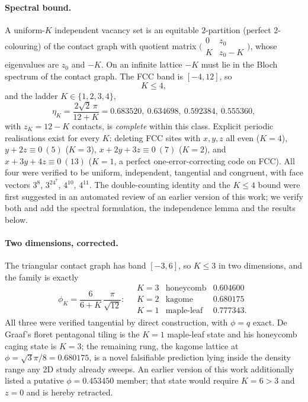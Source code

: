 \documentclass[aps,prl,twocolumn,superscriptaddress,floatfix]{revtex4-2}
\begin{document}
\paragraph{Spectral bound.} A uniform-$K$ independent vacancy set is an
equitable $2$-partition (perfect $2$-colouring) of the contact graph with
quotient matrix $\bigl(\begin{smallmatrix}0 & z_0\\ K & z_0-K\end{smallmatrix}\bigr)$,
whose eigenvalues are $z_0$ and $-K$. On an infinite lattice $-K$ must lie in
the Bloch spectrum of the contact graph. The FCC band is $[-4,12]$, so
\begin{equation}
K\leq 4 ,
\end{equation}
and the ladder $K\in\{1,2,3,4\}$,
\begin{equation}
\eta_K = \frac{2\sqrt2\,\pi}{12+K}
= 0.683520,\ 0.634698,\ 0.592384,\ 0.555360,
\label{eq:ladder}
\end{equation}
with $z_K = 12-K$ contacts, is \emph{complete} within this class. Explicit
periodic realisations exist for every $K$: deleting FCC sites with
$x,y,z$ all even ($K=4$), $y+2z\equiv0\ (5)$ ($K=3$),
$x+2y+3z\equiv0\ (7)$ ($K=2$), and $x+3y+4z\equiv0\ (13)$ ($K=1$, a perfect
one-error-correcting code on FCC). All four were verified to be uniform,
independent, tangential and congruent, with face vectors
$3^8$, $3^24^7$, $4^{10}$, $4^{11}$. The double-counting identity and the
$K\le4$ bound were first suggested in an automated review of an earlier version
of this work; we verify both and add the spectral formulation, the
independence lemma and the results below.

\paragraph{Two dimensions, corrected.} The triangular contact graph has band
$[-3,6]$, so $K\leq3$ in two dimensions, and the family is exactly
\begin{equation}
\phi_K=\frac{6}{6+K}\,\frac{\pi}{\sqrt{12}}:
\quad
\begin{array}{lll}
K=3 & \text{honeycomb} & 0.604600\\
K=2 & \text{kagome} & 0.680175\\
K=1 & \text{maple-leaf} & 0.777343 .
\end{array}
\end{equation}
All three were verified tangential by direct construction, with
$\phi=q$ exact. De Graaf's floret pentagonal tiling is the $K=1$ maple-leaf
state and his honeycomb caging state is $K=3$; the remaining rung, the kagome
lattice at $\phi=\sqrt3\pi/8=0.680175$, is a novel falsifiable prediction lying
inside the density range any 2D study already sweeps. An earlier version of
this work additionally listed a putative $\phi=0.453450$ member; that state
would require $K=6>3$ and $z=0$ and is hereby retracted.
\end{document}
